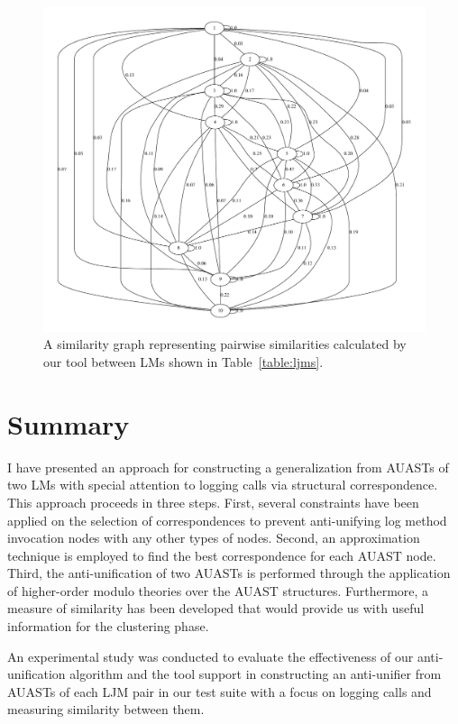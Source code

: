 \begin{figure} [H]
  \centering\includegraphics [width = \textwidth]{graphviz/au.pdf}
  \caption{A similarity graph representing pairwise similarities calculated by our tool between LMs shown in Table~\ref{table:ljms}.}
  \label{fig:au_graph}
\end{figure}




\section{Summary} \label{meth1-summary}
I have presented an approach for constructing a generalization from AUASTs of two LMs with special attention to logging calls via structural correspondence. This approach proceeds in three steps. First, several constraints have been applied on the selection of correspondences to prevent anti-unifying log method invocation nodes with any other types of nodes. Second, an approximation technique is employed to find the best correspondence for each AUAST node. Third, the anti-unification of two AUASTs is performed through the application of higher-order modulo theories over the AUAST structures. Furthermore, a measure of similarity has been developed that would provide us with useful information for the clustering phase.

An experimental study was conducted to evaluate the effectiveness of our anti-unification algorithm and the tool support in constructing an anti-unifier from AUASTs of each LJM pair in our test suite with a focus on logging calls and measuring similarity between them.







